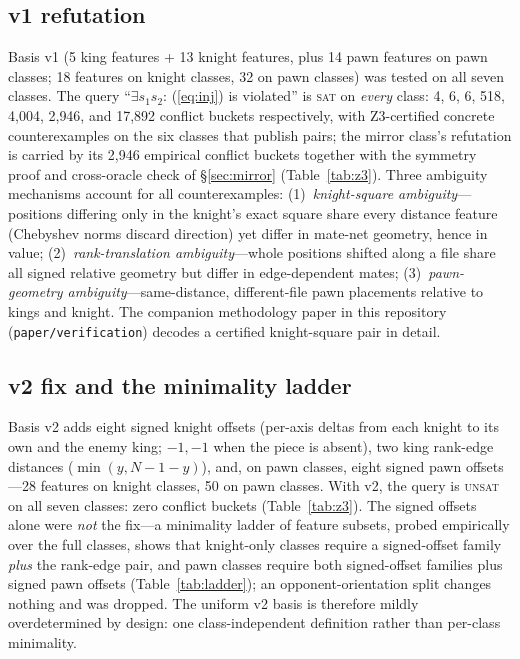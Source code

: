 \documentclass[conference]{IEEEtran}
\begin{document}
\subsection{v1 refutation}
Basis v1 (5 king features + 13 knight features, plus 14 pawn features on
pawn classes; 18 features on knight classes, 32 on pawn classes) was tested
on all seven classes. The query ``$\exists s_1 s_2$: (\ref{eq:inj}) is
violated'' is \textsc{sat} on \emph{every} class: 4, 6, 6, 518, 4{,}004,
2{,}946, and 17{,}892 conflict buckets respectively, with Z3-certified
concrete counterexamples on the six classes that publish pairs; the mirror
class's refutation is carried by its 2{,}946 empirical conflict buckets
together with the symmetry proof and cross-oracle check of
\S\ref{sec:mirror} (Table~\ref{tab:z3}). Three ambiguity
mechanisms account for all counterexamples:
(1)~\emph{knight-square ambiguity}---positions differing only in the
knight's exact square share every distance feature (Chebyshev norms discard
direction) yet differ in mate-net geometry, hence in value;
(2)~\emph{rank-translation ambiguity}---whole positions shifted along a file
share all signed relative geometry but differ in edge-dependent mates;
(3)~\emph{pawn-geometry ambiguity}---same-distance, different-file pawn
placements relative to kings and knight.
The companion methodology paper in this repository (\texttt{paper/verification})
decodes a certified knight-square pair in detail.

\subsection{v2 fix and the minimality ladder}
Basis v2 adds eight signed knight offsets (per-axis deltas from each knight
to its own and the enemy king; $-1,-1$ when the piece is absent), two king
rank-edge distances ($\min(y, N{-}1{-}y)$), and, on pawn classes, eight
signed pawn offsets---28 features on knight classes, 50 on pawn classes.
With v2, the query is \textsc{unsat} on all seven classes: zero conflict
buckets (Table~\ref{tab:z3}). The signed offsets alone were
\emph{not} the fix---a minimality ladder of feature subsets, probed
empirically over the full classes, shows that knight-only classes require a
signed-offset family \emph{plus} the rank-edge pair, and pawn classes
require both signed-offset families plus signed pawn offsets
(Table~\ref{tab:ladder}); an opponent-orientation split changes nothing and
was dropped. The uniform v2 basis is therefore mildly overdetermined by
design: one class-independent definition rather than per-class minimality.
\end{document}
